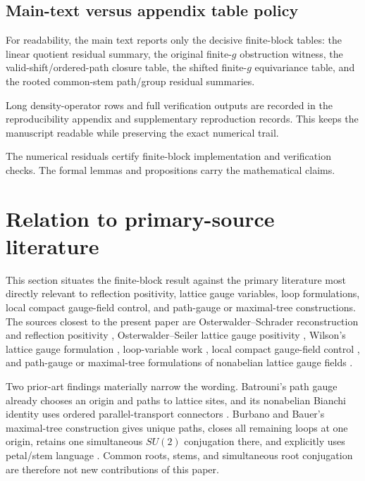 \documentclass[10pt]{article}
\begin{document}
\subsection{Main-text versus appendix table policy}

For readability, the main text reports only the decisive finite-block tables: the linear quotient residual summary, the original finite-\(g\) obstruction witness, the valid-shift/ordered-path closure table, the shifted finite-\(g\) equivariance table, and the rooted common-stem path/group residual summaries.

Long density-operator rows and full verification outputs are recorded in the reproducibility appendix and supplementary reproduction records.  This keeps the manuscript readable while preserving the exact numerical trail.

The numerical residuals certify finite-block implementation and verification checks.  The formal lemmas and propositions carry the mathematical claims.

\section{Relation to primary-source literature}

This section situates the finite-block result against the primary literature most directly relevant to reflection positivity, lattice gauge variables, loop formulations, local compact gauge-field control, and path-gauge or maximal-tree constructions.  The sources closest to the present paper are Osterwalder--Schrader reconstruction and reflection positivity \cite{OsterwalderSchrader1973,OsterwalderSchrader1975}, Osterwalder--Seiler lattice gauge positivity \cite{OsterwalderSeiler1978}, Wilson's lattice gauge formulation \cite{Wilson1974,Wilson2005,KogutSusskind1975}, loop-variable work \cite{Mandelstam1968,Giles1981}, local compact gauge-field control \cite{Luscher1982}, and path-gauge or maximal-tree formulations of nonabelian lattice gauge fields \cite{Batrouni1982,BurbanoBauer2024}.

Two prior-art findings materially narrow the wording.  Batrouni's path gauge already chooses an origin and paths to lattice sites, and its nonabelian Bianchi identity uses ordered parallel-transport connectors \cite{Batrouni1982}.  Burbano and Bauer's maximal-tree construction gives unique paths, closes all remaining loops at one origin, retains one simultaneous \(SU(2)\) conjugation there, and explicitly uses petal/stem language \cite{BurbanoBauer2024}.  Common roots, stems, and simultaneous root conjugation are therefore not new contributions of this paper.
\end{document}
